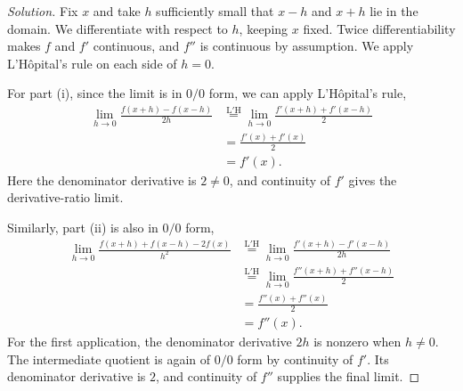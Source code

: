 \begin{proof}[Solution]
  Fix $x$ and take $h$ sufficiently small that
  $x-h$ and $x+h$ lie in the domain. We differentiate with respect
  to $h$, keeping $x$ fixed. Twice differentiability makes $f$ and
  $f'$ continuous, and $f''$ is continuous by assumption. We apply
  L'H\^opital's rule on each side of $h=0$.

  For part (i), since the limit is in $0/0$ form, we can apply
  L'H\^opital's rule,
  \[
    \begin{aligned}
      \lim_{h\to0}\frac{f(x+h)-f(x-h)}{2h}
        &\overset{\mathrm{L'H}}{=}
          \lim_{h\to0}\frac{f'(x+h)+f'(x-h)}2\\[4pt]
        &=\frac{f'(x)+f'(x)}2\\
        &=f'(x).
    \end{aligned}
  \]
  Here the denominator derivative is $2\ne0$,
  and continuity of $f'$ gives the derivative-ratio limit.

  Similarly, part (ii) is also in $0/0$ form,
  \[
    \begin{aligned}
      \lim_{h\to0}\frac{f(x+h)+f(x-h)-2f(x)}{h^2}
        &\overset{\mathrm{L'H}}{=}
          \lim_{h\to0}\frac{f'(x+h)-f'(x-h)}{2h}\\[4pt]
        &\overset{\mathrm{L'H}}{=}
          \lim_{h\to0}\frac{f''(x+h)+f''(x-h)}2\\[4pt]
        &=\frac{f''(x)+f''(x)}2\\
        &=f''(x).
    \end{aligned}
  \]
  For the first application, the denominator
  derivative $2h$ is nonzero when $h\ne0$. The intermediate
  quotient is again of $0/0$ form by continuity of $f'$. Its
  denominator derivative is $2$, and continuity of $f''$ supplies
  the final limit.
\end{proof}
